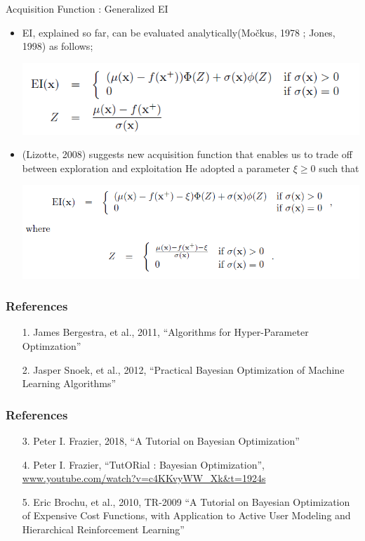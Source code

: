 \documentclass{beamer}
\begin{document}
%
\begin{frame}{Acquisition Function : Generalized EI}
\begin{itemize}
\item
EI, explained so far, can be evaluated analytically(Močkus, 1978 ; Jones, 1998) as follows;
\begin{center}
\includegraphics[width=.7\textwidth]{analytic_form_1}
\end{center}
\item
(Lizotte, 2008) suggests new acquisition function that enables us to trade off between exploration and exploitation
He adopted a parameter \(\xi\ge0\) such that
\begin{center}
\includegraphics[width=.7\textwidth]{analytic_form_2}
\end{center}
\end{itemize}
\end{frame}


%
\begin{frame}
\frametitle{References}
\begin{enumerate}
\item[1.]
James Bergestra, et al., 2011, ``Algorithms for Hyper-Parameter Optimzation''
\item[2.]
Jasper Snoek, et al., 2012, ``Practical Bayesian Optimization of Machine Learning Algorithms''
\end{enumerate}
\end{frame}


%
\begin{frame}
\frametitle{References}
\begin{enumerate}
\item[3.]
Peter I. Frazier, 2018, ``A Tutorial on Bayesian Optimization''
\item[4.]
Peter I. Frazier, ``TutORial : Bayesian Optimization'', \url{www.youtube.com/watch?v=c4KKvyWW_Xk&t=1924s}
\item[5.]
Eric Brochu, et al., 2010, TR-2009 ``A Tutorial on Bayesian Optimization of Expensive Cost Functions, with Application to Active User Modeling and Hierarchical Reinforcement Learning''
\end{enumerate}
\end{frame}
\end{document}
